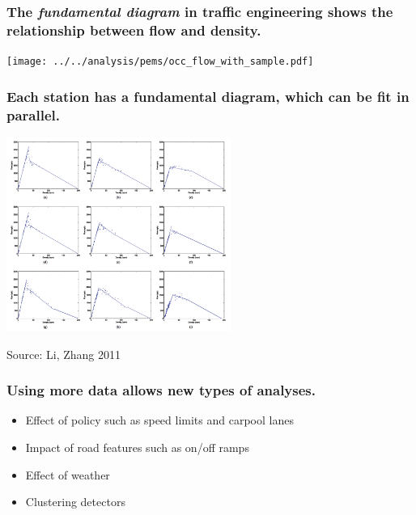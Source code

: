 \documentclass{beamer}
\begin{document}
\begin{frame}

    \frametitle{The \emph{fundamental diagram} in traffic engineering shows
        the relationship between flow and density.}

    \centerline{\texttt{[image: ../../analysis/pems/occ\_flow\_with\_sample.pdf]}}

\end{frame}
\begin{frame}

    \frametitle{Each station has a fundamental diagram, which can be fit in
    parallel.}

\centerline{\includegraphics[height=2.5in]{many_fundamental_diagram.png}}

Source: Li, Zhang 2011

\end{frame}
\begin{frame}

    \frametitle{Using more data allows new types of analyses.}


    \begin{itemize}
        \item Effect of policy such as speed limits and carpool lanes
        \item Impact of road features such as on/off ramps
        \item Effect of weather
        \item Clustering detectors
    \end{itemize}

\end{frame}
\end{document}
